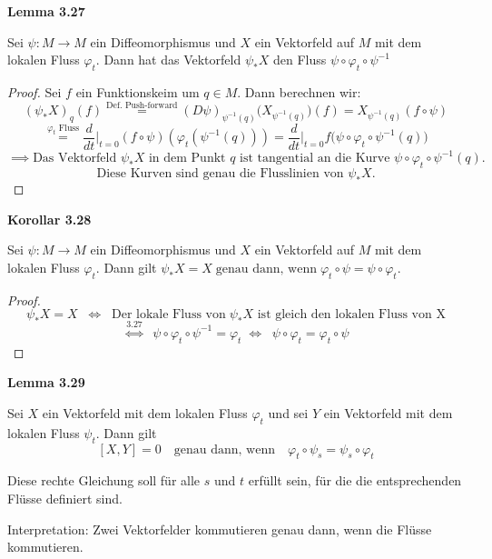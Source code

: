 \documentclass[fleqn, 12pt, letterpaper]{article}
\newcommand{\txt}[1]{\text{#1}}
\begin{document}
\textbf{Lemma 3.27} 

Sei $\psi: M \rightarrow M$ ein Diffeomorphismus und $X$ ein Vektorfeld auf $M$ mit dem lokalen Fluss $\varphi_t$. Dann hat das Vektorfeld $\psi_\ast X$ den Fluss 
\(
\psi \circ \varphi_t \circ \psi^{-1}
\)

\begin{proof}
Sei $f$ ein Funktionskeim um $q \in M$. Dann berechnen wir:
\[
(\psi_* X)_{q}(f) \overset{\txt{Def. Push-forward}}{=} (D \psi)_{\psi^{-1}(q)} \big(X_{\psi^{-1}(q)}\big)(f) = X_{\psi^{-1}(q)}(f \circ \psi)
\]
\[\overset{\varphi_t\txt{ Fluss}}{=} \frac{d}{dt} \big|_{t=0} (f \circ \psi)(\varphi_t(\psi^{-1}(q))) = \frac{d}{dt} \big|_{t=0} f \big(\psi \circ \varphi_t \circ \psi^{-1}(q)\big)\]
\[
\implies \text{Das Vektorfeld } \psi_\ast X \text{ in dem Punkt } q \text{ ist tangential an die Kurve } \psi \circ \varphi_{t} \circ \psi^{-1}(q).
\]
\[
\text{Diese Kurven sind genau die Flusslinien von } \psi_\ast X.
\]
\end{proof}

\textbf{Korollar 3.28}

Sei $\psi: M \rightarrow M$ ein Diffeomorphismus und $X$ ein Vektorfeld auf $M$ mit dem lokalen Fluss $\varphi_t$. Dann gilt 
\(
\psi_\ast X = X \; \text{genau dann, wenn} \; \varphi_t \circ \psi = \psi \circ \varphi_t.
\)
\begin{proof}
    \[
\psi_\ast X = X \;\; \Leftrightarrow \;\;\txt{Der lokale Fluss von}\;\psi_\ast X \txt{ ist gleich den lokalen Fluss von X}
\]
\[
\overset{3.27}{\Leftrightarrow } \;\; \psi \circ\varphi_t\circ\psi^{-1}=\varphi_t\;\Leftrightarrow \;\;\psi\circ\varphi_t=\varphi_t\circ\psi
\]
\end{proof}

\textbf{Lemma 3.29}

Sei $X$ ein Vektorfeld mit dem lokalen Fluss $\varphi_t$ und sei $Y$ ein Vektorfeld mit dem lokalen Fluss $\psi_t$. 
Dann gilt 
\[
[X, Y] = 0 \quad \text{genau dann, wenn} \quad \varphi_t \circ \psi_s = \psi_s \circ \varphi_t
\]

\vspace{1em}

Diese rechte Gleichung soll für alle $s$ und $t$ erfüllt sein, für die die entsprechenden Flüsse definiert sind.

\vspace{1em}

Interpretation: Zwei Vektorfelder kommutieren genau dann, wenn die Flüsse kommutieren.
\end{document}
